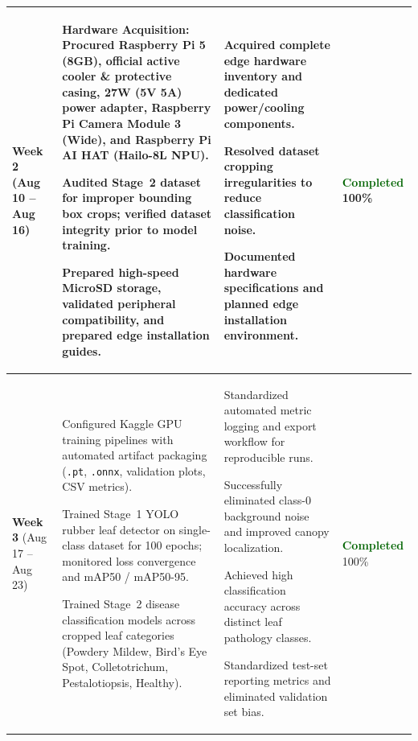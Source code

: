 \documentclass[10pt,a4paper]{article}
\begin{document}
\begin{tabularx}{\textwidth}{@{} p{2.2cm} >{\raggedright\arraybackslash}X >{\raggedright\arraybackslash}X p{2.0cm} @{}}
\textbf{Week 2}\newline
\footnotesize{(Aug 10 -- Aug 16)} & 
\begin{tableitems}
    \item \textbf{Hardware Acquisition:} Procured Raspberry Pi 5 (8GB), official active cooler \& protective casing, 27W (5V 5A) power adapter, Raspberry Pi Camera Module 3 (Wide), and Raspberry Pi AI HAT (Hailo-8L NPU).
    \item Audited Stage~2 dataset for improper bounding box crops; verified dataset integrity prior to model training.
    \item Prepared high-speed MicroSD storage, validated peripheral compatibility, and prepared edge installation guides.
\end{tableitems} & 
\begin{tableitems}
    \item Acquired complete edge hardware inventory and dedicated power/cooling components.
    \item Resolved dataset cropping irregularities to reduce classification noise.
    \item Documented hardware specifications and planned edge installation environment.
\end{tableitems} & 
\textcolor{darkgreen}{\textbf{Completed}}\newline
\footnotesize{100\%} \\

\midrule

\textbf{Week 3}\newline
\footnotesize{(Aug 17 -- Aug 23)} & 
\begin{tableitems}
    \item Configured Kaggle GPU training pipelines with automated artifact packaging (\texttt{.pt}, \texttt{.onnx}, validation plots, CSV metrics).
    \item Trained Stage~1 YOLO rubber leaf detector on single-class dataset for 100 epochs; monitored loss convergence and mAP50 / mAP50-95.
    \item Trained Stage~2 disease classification models across cropped leaf categories (Powdery Mildew, Bird's Eye Spot, Colletotrichum, Pestalotiopsis, Healthy).
\end{tableitems} & 
\begin{tableitems}
    \item Standardized automated metric logging and export workflow for reproducible runs.
    \item Successfully eliminated class-0 background noise and improved canopy localization.
    \item Achieved high classification accuracy across distinct leaf pathology classes.
    \item Standardized test-set reporting metrics and eliminated validation set bias.
\end{tableitems} & 
\textcolor{darkgreen}{\textbf{Completed}}\newline
\footnotesize{100\%} \\


\end{tabularx}
\end{document}
